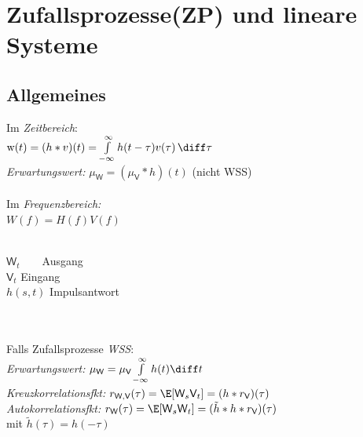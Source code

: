 \documentclass[german,color,6pt]{latex4ei/latex4ei_sheet}
\begin{document}
\section{Zufallsprozesse(ZP) und lineare Systeme}
\begin{sectionbox}
	\subsection{Allgemeines}
	Im \emph{Zeitbereich}:\\
	$\text{w}(t)  =  (h \ast v)(t) = \int\limits_{- \infty}^{\infty} h(t - \tau) v(\tau) \, \diff\tau$ \\
	\emph{Erwartungswert:} $\mu_{\textsf{W}} = (\mu_{\textsf{V}} \ast h)(t)$ (nicht WSS)\\
	\\
	Im \emph{Frequenzbereich:}\\
	$W(f) = H(f)V(f)$ \\ \\
	\parbox{3.8cm}{}
	\parbox{3.5cm}{$\textsf{W}_t$  \,\,\,\,\,\,\,\,  Ausgang\\
		$\textsf{V}_t$  \qquad Eingang\\
		$h(s,t)$  Impulsantwort}	\\ \\
	Falls Zufallsprozesse \emph{WSS}: \\
	\emph{Erwartungswert:} $\mu_{\textsf{W}} = \mu_{\textsf{V}} \int\limits_{-\infty}^{\infty} h(t) \diff t$\\
	\emph{Kreuzkorrelationsfkt:} $r_{\textsf{W},\textsf{V}}(\tau) = \E [\textsf{W}_s \textsf{V}_t] =  (h * r_{\textsf{V}})(\tau)$\\
	\emph{Autokorrelationsfkt:} $r_{\textsf{W}}(\tau) = \E [\textsf{W}_s \textsf{W}_t] = (\tilde h * h * r_{\textsf{V}})(\tau)$\\
	 mit $\tilde h (\tau) = h(-\tau)$
\end{sectionbox}
\end{document}

